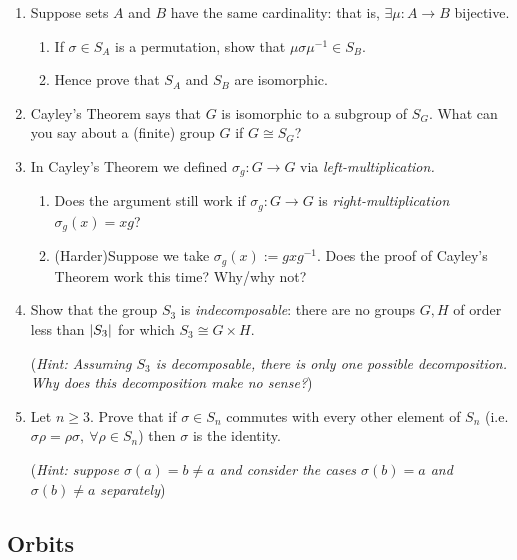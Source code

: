 \begin{exercises}
\begin{enumerate}
		
	  \item\label{exs:symmwd} Suppose sets $A$ and $B$ have the same cardinality: that is, $\exists \mu:A\to B$ bijective.
	  \begin{enumerate}
	    \item If $\sigma\in S_A$ is a permutation, show that $\mu\sigma\mu^{-1}\in S_B$.
	    \item Hence prove that $S_A$ and $S_B$ are isomorphic.
	  \end{enumerate}
	  
	  
	  \item Cayley's Theorem says that $G$ is isomorphic to a subgroup of $S_G$.  What can you say about a (finite) group $G$ if $G\cong S_G$?
	
	  
	  \item In Cayley's Theorem we defined $\sigma_g:G\to G$ via \emph{left-multiplication.}
	  \begin{enumerate}
	    \item Does the argument still work if $\sigma_g:G\to G$ is \emph{right-multiplication} $\sigma_g(x)=xg$?
	    
	    \item (Harder)\lstsp Suppose we take $\sigma_g(x):=gx g^{-1}$. Does the proof of Cayley's Theorem work this time? Why/why not?
	  \end{enumerate}
		
		
		\item Show that the group $S_3$ is \emph{indecomposable}: there are no groups $G,H$ of order less than $\left| S_3\right|$ for which $S_3\cong G\times H$.\par
		(\emph{Hint: Assuming $S_3$ is decomposable, there is only one possible decomposition. Why does this decomposition make no sense?})
	  
	  
	  \item\label{exs:centerSn} Let $n\ge 3$. Prove that if $\sigma\in S_n$ commutes with every other element of $S_n$ (i.e. $\sigma\rho=\rho\sigma,\ \forall \rho\in S_n$) then $\sigma$ is the identity.\par
	  (\emph{Hint: suppose $\sigma(a)=b\neq a$ and consider the cases $\sigma(b)=a$ and $\sigma(b)\neq a$ separately})
	
	\end{enumerate}
\end{exercises}


\clearpage


\subsection{Orbits}\label{sec:orbits}

